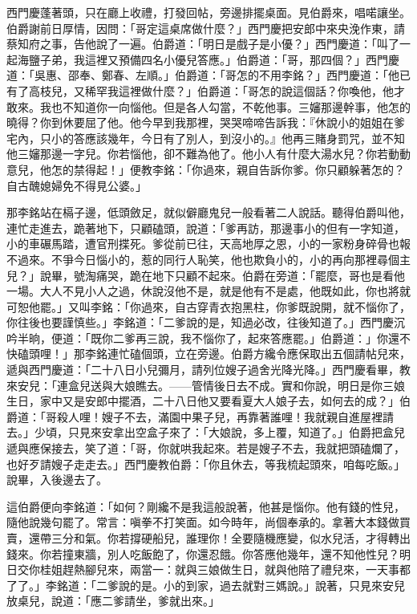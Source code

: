 西門慶蓬著頭，只在廳上收禮，打發回帖，旁邊排擺桌面。見伯爵來，唱喏讓坐。伯爵謝前日厚情，因問：「哥定這桌席做什麼？」西門慶把安郎中來央浼作東，請蔡知府之事，告他說了一遍。伯爵道：「明日是戲子是小優？」西門慶道：「叫了一起海鹽子弟，我這裡又預備四名小優兒答應。」伯爵道：「哥，那四個？」西門慶道：「吳惠、邵奉、鄭春、左順。」伯爵道：「哥怎的不用李銘？」西門慶道：「他已有了高枝兒，又稀罕我這裡做什麼？」伯爵道：「哥怎的說這個話？你喚他，他才敢來。我也不知道你一向惱他。但是各人勾當，不乾他事。三嬸那邊幹事，他怎的曉得？你到休要屈了他。他今早到我那裡，哭哭啼啼告訴我：『休說小的姐姐在爹宅內，只小的答應該幾年，今日有了別人，到沒小的。』他再三賭身罰咒，並不知他三嬸那邊一字兒。你若惱他，卻不難為他了。他小人有什麼大湯水兒？你若動動意兒，他怎的禁得起！」便教李銘：「你過來，親自告訴你爹。你只顧躲著怎的？自古醜媳婦免不得見公婆。」

那李銘站在槅子邊，低頭斂足，就似僻廳鬼兒一般看著二人說話。聽得伯爵叫他，連忙走進去，跪著地下，只顧磕頭，說道：「爹再訪，那邊事小的但有一字知道，小的車碾馬踏，遭官刑揲死。爹從前已往，天高地厚之恩，小的一家粉身碎骨也報不過來。不爭今日惱小的，惹的同行人恥笑，他也欺負小的，小的再向那裡尋個主兒？」說畢，號淘痛哭，跪在地下只顧不起來。伯爵在旁道：「罷麼，哥也是看他一場。大人不見小人之過，休說沒他不是，就是他有不是處，他既如此，你也將就可恕他罷。」又叫李銘：「你過來，自古穿青衣抱黑柱，你爹既說開，就不惱你了，你往後也要謹慎些。」李銘道：「二爹說的是，知過必改，往後知道了。」西門慶沉吟半晌，便道：「既你二爹再三說，我不惱你了，起來答應罷。」伯爵道：」你還不快磕頭哩！」那李銘連忙磕個頭，立在旁邊。伯爵方纔令應保取出五個請帖兒來，遞與西門慶道：「二十八日小兒彌月，請列位嫂子過舍光降光降。」西門慶看畢，教來安兒：「連盒兒送與大娘瞧去。——管情後日去不成。實和你說，明日是你三娘生日，家中又是安郎中擺酒，二十八日他又要看夏大人娘子去，如何去的成？」伯爵道：「哥殺人哩！嫂子不去，滿園中果子兒，再靠著誰哩！我就親自進屋裡請去。」少頃，只見來安拿出空盒子來了：「大娘說，多上覆，知道了。」伯爵把盒兒遞與應保接去，笑了道：「哥，你就哄我起來。若是嫂子不去，我就把頭磕爛了，也好歹請嫂子走走去。」西門慶教伯爵：「你且休去，等我梳起頭來，咱每吃飯。」說畢，入後邊去了。

這伯爵便向李銘道：「如何？剛纔不是我這般說著，他甚是惱你。他有錢的性兒，隨他說幾句罷了。常言：嗔拳不打笑面。如今時年，尚個奉承的。拿著大本錢做買賣，還帶三分和氣。你若撐硬船兒，誰理你！全要隨機應變，似水兒活，才得轉出錢來。你若撞東牆，別人吃飯飽了，你還忍餓。你答應他幾年，還不知他性兒？明日交你桂姐趕熱腳兒來，兩當一：就與三娘做生日，就與他陪了禮兒來，一天事都了了。」李銘道：「二爹說的是。小的到家，過去就對三媽說。」說著，只見來安兒放桌兒，說道：「應二爹請坐，爹就出來。」

